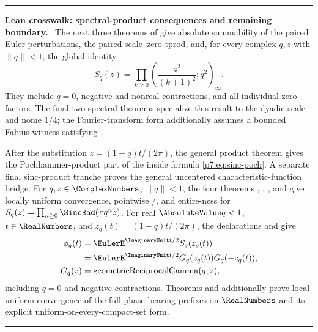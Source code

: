\documentclass[11pt,oneside]{article}
\numberwithin{equation}{section}
\theoremstyle{definition}
\theoremstyle{remark}
\newenvironment{statusbox}[1]{%
  \par\medskip\noindent\begin{center}\begin{minipage}{0.94\textwidth}%
  \color{linkblue}\hrule\vspace{0.65em}%
  \color{black}\textbf{\color{linkblue}#1.}\ }{%
  \par\vspace{0.65em}\color{linkblue}\hrule
  \end{minipage}\end{center}\medskip}
\begin{document}
\begin{statusbox}{Lean crosswalk: spectral-product consequences and remaining boundary}
The next three theorems of
 give absolute
summability of the paired Euler perturbations, the paired scale--zero tprod,
and, for every complex $q,z$ with $\lVert q\rVert<1$, the global identity
\[
 S_q(z)=\prod_{k\ge0}
 \left(\frac{z^2}{(k+1)^2};q^2\right)_\infty .
\]
They include $q=0$, negative and nonreal contractions, and all individual
zero factors.  The final two spectral theorems specialize this result to the
dyadic scale and nome $1/4$; the Fourier-transform form additionally assumes
a bounded Fabius witness satisfying .

After the substitution $z=(1-q)t/(2\pi)$, the general product theorem gives
the Pochhammer-product part of the inside formula
\eqref{p7:eq:sinc-poch}.  A separate final sinc-product tranche proves the
general uncentered characteristic-function bridge.  For
$q,z\in\ComplexNumbers$, $\lVert q\rVert<1$, the four theorems
,
,
, and
 give locally uniform convergence,
pointwise /, and entire-ness for
$S_q(z)=\prod_{n\ge0}\SincRad(\pi q^nz)$.  For real $\AbsoluteValue q<1$, $t\in\RealNumbers$, and
$z_q(t)=(1-q)t/(2\pi)$, the declarations
and
give
\[
\begin{aligned}
 \phi_q(t)
   &=\EulerE^{\ImaginaryUnit t/2}S_q(z_q(t)) \\
   &=\EulerE^{\ImaginaryUnit t/2}G_q(z_q(t))G_q(-z_q(t)), \\
 G_q(z)&=\operatorname{geometricReciprocalGamma}(q,z),
\end{aligned}
\]
including $q=0$ and negative contractions.
Theorems  and
 additionally prove local
uniform convergence of the full phase-bearing prefixes on \(\RealNumbers\) and its
explicit uniform-on-every-compact-set form.


\end{statusbox}
\end{document}
